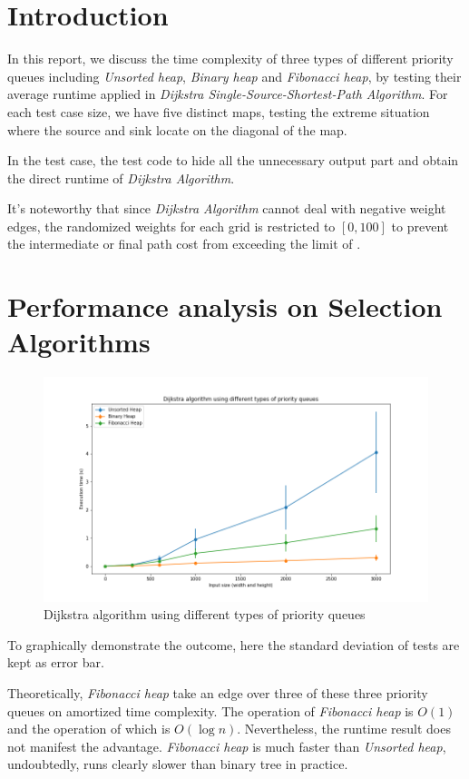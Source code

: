 
\section{Introduction}
In this report, we discuss the time complexity of three types of different priority queues including \emph{Unsorted heap}, \emph{Binary heap} and \emph{Fibonacci heap}, by testing their average runtime applied in \emph{Dijkstra Single-Source-Shortest-Path Algorithm}. For each test case size, we have five distinct maps, testing the extreme situation where the source and sink locate on the diagonal of the map.

In the test case, the test code  to hide all the unnecessary output part and obtain the direct runtime of \emph{Dijkstra Algorithm}.

It's noteworthy that since \emph{Dijkstra Algorithm} cannot deal with negative weight edges, the randomized weights for each grid is restricted to $[0, 100]$ to prevent the intermediate or final path cost from exceeding the limit of .

\section{Performance analysis on Selection Algorithms}
\begin{figure}[H]
    \centering
    \includegraphics[width=0.75\linewidth]{../a3/test/res}
    \caption{Dijkstra algorithm using different types of priority queues}\label{res}
\end{figure}
To graphically demonstrate the outcome, here the standard deviation of tests are kept as error bar.

Theoretically, \emph{Fibonacci heap} take an edge over three of these three priority queues on amortized time complexity. The  operation of \emph{Fibonacci heap} is $O(1)$ and the  operation of which is $O(\log n)$. Nevertheless, the runtime result does not manifest the advantage. \emph{Fibonacci heap} is much faster than \emph{Unsorted heap}, undoubtedly, runs clearly slower than binary tree in practice.

